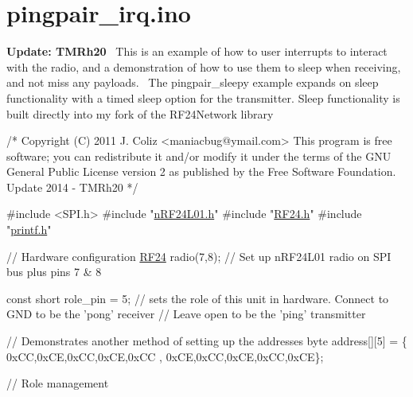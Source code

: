 \hypertarget{pingpair_irq_8ino-example}{}\section{pingpair\+\_\+irq.\+ino}
{\bfseries Update\+: T\+M\+Rh20}~\newline
 This is an example of how to user interrupts to interact with the radio, and a demonstration of how to use them to sleep when receiving, and not miss any payloads.~\newline
 The pingpair\+\_\+sleepy example expands on sleep functionality with a timed sleep option for the transmitter. Sleep functionality is built directly into my fork of the R\+F24\+Network library~\newline



\begin{DoxyCodeInclude}
\textcolor{comment}{/*}
\textcolor{comment}{ Copyright (C) 2011 J. Coliz <maniacbug@ymail.com>}
\textcolor{comment}{}
\textcolor{comment}{ This program is free software; you can redistribute it and/or}
\textcolor{comment}{ modify it under the terms of the GNU General Public License}
\textcolor{comment}{ version 2 as published by the Free Software Foundation.}
\textcolor{comment}{ }
\textcolor{comment}{ Update 2014 - TMRh20}
\textcolor{comment}{ */}

\textcolor{preprocessor}{#include <SPI.h>}
\textcolor{preprocessor}{#include "\hyperlink{nRF24L01_8h}{nRF24L01.h}"}
\textcolor{preprocessor}{#include "\hyperlink{RF24_8h}{RF24.h}"}
\textcolor{preprocessor}{#include "\hyperlink{printf_8h}{printf.h}"}

\textcolor{comment}{// Hardware configuration}
\hyperlink{classRF24}{RF24} radio(7,8);                          \textcolor{comment}{// Set up nRF24L01 radio on SPI bus plus pins 7 & 8}
                                        
\textcolor{keyword}{const} \textcolor{keywordtype}{short} role\_pin = 5;                 \textcolor{comment}{// sets the role of this unit in hardware.  Connect to GND to be
       the 'pong' receiver}
                                          \textcolor{comment}{// Leave open to be the 'ping' transmitter}

\textcolor{comment}{// Demonstrates another method of setting up the addresses}
byte address[][5] = \{ 0xCC,0xCE,0xCC,0xCE,0xCC , 0xCE,0xCC,0xCE,0xCC,0xCE\};

\textcolor{comment}{// Role management}


\end{DoxyCodeInclude}
